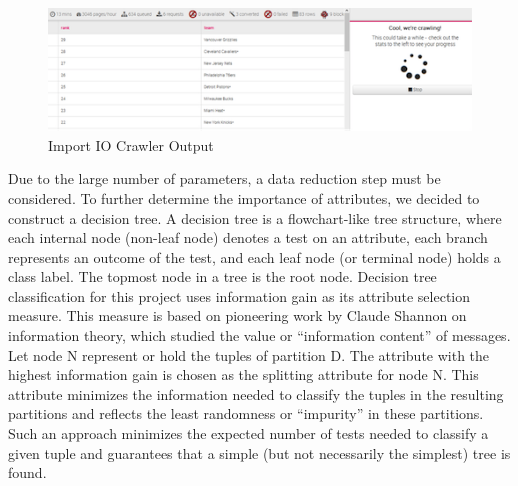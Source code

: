 \documentclass{acm_proc_article-sp}
\begin{document}
\begin{figure}[!htb]
\centering
\includegraphics{Fig-3.png}
\caption{Import IO Crawler Output}
\end{figure}

Due to the large number of parameters, a data reduction step must be considered. To further determine the importance of attributes, we decided to construct a decision tree. A decision tree is a flowchart-like tree structure, where each internal node (non-leaf node) denotes a test on an attribute, each branch represents an outcome of the test, and each leaf node (or terminal node) holds a class label. The topmost node in a tree is the root node. Decision tree classification for this project uses information gain as its attribute selection measure. This measure is based on pioneering work by Claude Shannon on information theory, which studied the value or ``information content'' of messages. Let node N represent or hold the tuples of partition D. The attribute with the highest information gain is chosen as the splitting attribute for node N. This attribute minimizes the information needed to classify the tuples in the resulting partitions and reflects the least randomness or ``impurity'' in these partitions. Such an approach minimizes the expected number of tests needed to classify a given tuple and guarantees that a simple (but not necessarily the simplest) tree is found. 
\end{document}

